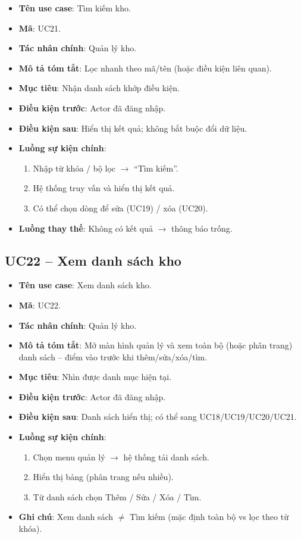 \begin{itemize}[leftmargin=1.5cm]
    \item \textbf{Tên use case}: Tìm kiếm kho.
    \item \textbf{Mã}: UC21.
    \item \textbf{Tác nhân chính}: Quản lý kho.
    \item \textbf{Mô tả tóm tắt}: Lọc nhanh theo mã/tên (hoặc điều kiện liên quan).
    \item \textbf{Mục tiêu}: Nhận danh sách khớp điều kiện.
    \item \textbf{Điều kiện trước}: Actor đã đăng nhập.
    \item \textbf{Điều kiện sau}: Hiển thị kết quả; không bắt buộc đổi dữ liệu.
    \item \textbf{Luồng sự kiện chính}:
    \begin{enumerate}
        \item Nhập từ khóa / bộ lọc $\rightarrow$ ``Tìm kiếm''.
        \item Hệ thống truy vấn và hiển thị kết quả.
        \item Có thể chọn dòng để sửa (UC19) / xóa (UC20).
    \end{enumerate}
    \item \textbf{Luồng thay thế}: Không có kết quả $\rightarrow$ thông báo trống.
\end{itemize}


\subsection{UC22 -- Xem danh sách kho}

\begin{itemize}[leftmargin=1.5cm]
    \item \textbf{Tên use case}: Xem danh sách kho.
    \item \textbf{Mã}: UC22.
    \item \textbf{Tác nhân chính}: Quản lý kho.
    \item \textbf{Mô tả tóm tắt}: Mở màn hình quản lý và xem toàn bộ (hoặc phân trang) danh sách -- điểm vào trước khi thêm/sửa/xóa/tìm.
    \item \textbf{Mục tiêu}: Nhìn được danh mục hiện tại.
    \item \textbf{Điều kiện trước}: Actor đã đăng nhập.
    \item \textbf{Điều kiện sau}: Danh sách hiển thị; có thể sang UC18/UC19/UC20/UC21.
    \item \textbf{Luồng sự kiện chính}:
    \begin{enumerate}
        \item Chọn menu quản lý $\rightarrow$ hệ thống tải danh sách.
        \item Hiển thị bảng (phân trang nếu nhiều).
        \item Từ danh sách chọn Thêm / Sửa / Xóa / Tìm.
    \end{enumerate}
    \item \textbf{Ghi chú}: Xem danh sách $\neq$ Tìm kiếm (mặc định toàn bộ vs lọc theo từ khóa).
\end{itemize}


